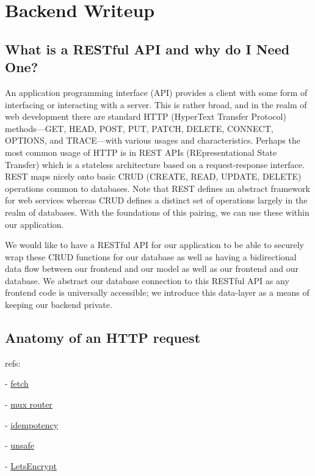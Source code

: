\documentclass[11pt, twoside, reqno]{book}
\begin{document}
\startmain
\chapter{Backend Writeup}

\section{What is a RESTful API and why do I Need One?}

An application programming interface (API) provides a client with some form of interfacing or interacting with a server. This is rather broad, and in the realm of web development there are standard HTTP (HyperText Transfer Protocol) methods—GET, HEAD, POST, PUT, PATCH, DELETE, CONNECT, OPTIONS, and TRACE—with various usages and characteristics. Perhaps the most common usage of HTTP is in REST APIs (REpresentational State Transfer) which is a stateless architecture based on a request-response interface. REST maps nicely onto basic CRUD (CREATE, READ, UPDATE, DELETE) operations common to databases. Note that REST defines an abstract framework for web services whereas CRUD defines a distinct set of operations largely in the realm of databases. With the foundations of this pairing, we can use these within our application.

We would like to have a RESTful API for our application to be able to securely wrap these CRUD functions for our database as well as having a bidirectional data flow between our frontend and our model as well as our frontend and our database. We abstract our database connection to this RESTful API as any frontend code is universally accessible; we introduce this data-layer as a means of keeping our backend private.

\section{Anatomy of an HTTP request}

refs:

- \href{https://developer.mozilla.org/en-US/docs/Web/API/Fetch_API}{fetch}

- \href{http://www.gorillatoolkit.org/pkg/mux}{mux router}

- \href{https://developer.mozilla.org/en-US/docs/Glossary/idempotent}{idempotency}

- \href{https://developer.mozilla.org/en-US/docs/Glossary/safe}{unsafe}

- \href{https://letsencrypt.org/}{LetsEncrypt}
\end{document}
